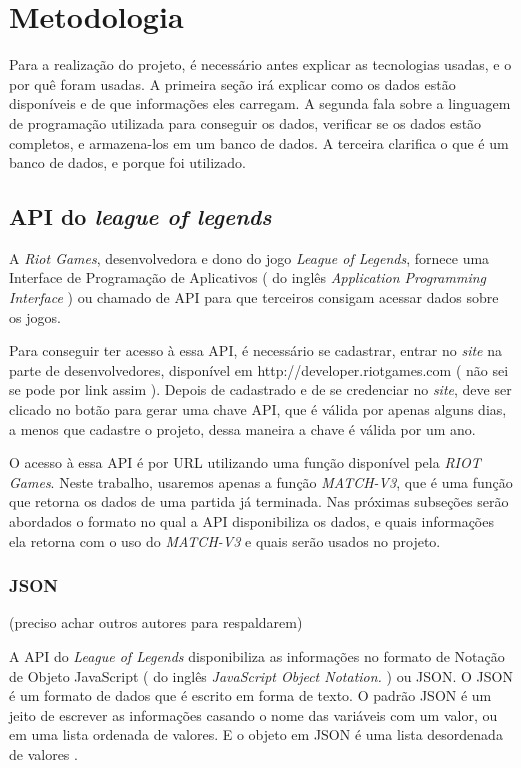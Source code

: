\chapter{Metodologia}

Para a realização do projeto, é necessário antes explicar as tecnologias usadas, e o por quê foram usadas. A primeira seção irá explicar como os dados estão disponíveis e de que informações eles carregam.  A segunda fala sobre a linguagem de programação utilizada para conseguir os dados, verificar se os dados estão completos, e armazena-los em um banco de dados. A terceira clarifica o que é um banco de dados, e porque foi utilizado.

\section{API do \textit{league of legends}}
A \textit{Riot Games}, desenvolvedora e dono do jogo \textit{League of Legends}, fornece uma Interface de Programação de Aplicativos ( do inglês \textit{Application Programming Interface} ) ou chamado de API para que terceiros consigam acessar dados sobre os jogos.

Para conseguir ter acesso à essa API, é necessário se cadastrar, entrar no \textit{site} na parte de desenvolvedores, disponível em http://developer.riotgames.com ( não sei se pode por link assim ).  Depois de cadastrado e de se credenciar no \textit{site}, deve ser clicado no botão para gerar uma chave API, que é válida por apenas alguns dias, a menos que cadastre o projeto, dessa maneira a chave é válida por um ano.

O acesso à essa API é por URL utilizando uma função disponível pela \textit{RIOT Games}. Neste trabalho, usaremos apenas a função \textit{MATCH-V3}, que é uma função que retorna os dados de uma partida já terminada.
Nas próximas subseções serão abordados o formato no qual a API disponibiliza os dados, e quais informações ela retorna com o uso do \textit{MATCH-V3} e quais serão usados no projeto.
\subsection{JSON}
(preciso achar outros autores para respaldarem)

A API do \textit{League of Legends} disponibiliza as informações no formato de Notação de Objeto JavaScript ( do inglês \textit{ JavaScript Object Notation.} ) ou JSON.
O JSON é um formato de dados que é escrito em forma de texto. O padrão JSON é um jeito de escrever as informações casando o nome das variáveis com um valor, ou em uma lista ordenada de valores. E o objeto em JSON é uma lista desordenada de valores \citep{json2}.
 

